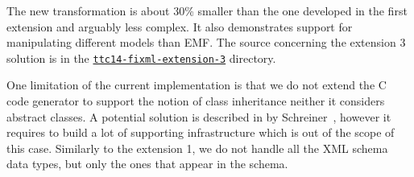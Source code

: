 The new transformation is about 30\% smaller than the one developed in the first extension and arguably less complex.
It also demonstrates \SIGMA support for manipulating different models than EMF.
The source concerning the extension 3 solution is in the \href{https://github.com/fikovnik/ttc14-fixml-sigma/tree/master/ttc14-fixml-extension-3}{\texttt{ttc14-fixml-extension-3}} directory.

One limitation of the current implementation is that we do not extend the C code generator to support the notion of class inheritance neither it considers abstract classes.
A potential solution is described in by Schreiner~\cite{Schreiner1993}, however it requires to build a lot of supporting infrastructure which is out of the scope of this \TTC case.
Similarly to the extension 1, we do not handle all the XML schema data types, but only the ones that appear in the \FIXML schema.
